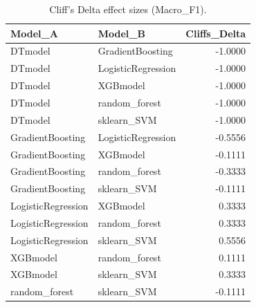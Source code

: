 \begin{table}[t]
\centering
\begin{tabular}{llr}
\toprule
Model_A & Model_B & Cliffs_Delta \\
\midrule
DTmodel & GradientBoosting & -1.0000 \\
DTmodel & LogisticRegression & -1.0000 \\
DTmodel & XGBmodel & -1.0000 \\
DTmodel & random_forest & -1.0000 \\
DTmodel & sklearn_SVM & -1.0000 \\
GradientBoosting & LogisticRegression & -0.5556 \\
GradientBoosting & XGBmodel & -0.1111 \\
GradientBoosting & random_forest & -0.3333 \\
GradientBoosting & sklearn_SVM & -0.1111 \\
LogisticRegression & XGBmodel & 0.3333 \\
LogisticRegression & random_forest & 0.3333 \\
LogisticRegression & sklearn_SVM & 0.5556 \\
XGBmodel & random_forest & 0.1111 \\
XGBmodel & sklearn_SVM & 0.3333 \\
random_forest & sklearn_SVM & -0.1111 \\
\bottomrule
\end{tabular}
\caption{Cliff's Delta effect sizes (Macro_F1).}
\label{tab:cliffs_Macro_F1}
\end{table}